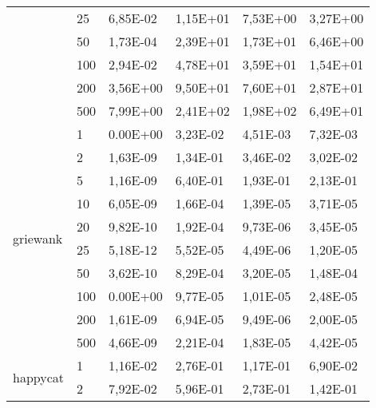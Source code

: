 \begin{longtable}[c]{|m{3.5cm}|l|l|l|l|l|}
                                        & 25        & 6,85E-02   & 1,15E+01   & 7,53E+00   & 3,27E+00  \\ \cline{2-6} 
                                        & 50        & 1,73E-04   & 2,39E+01   & 1,73E+01   & 6,46E+00  \\ \cline{2-6} 
                                        & 100       & 2,94E-02   & 4,78E+01   & 3,59E+01   & 1,54E+01  \\ \cline{2-6} 
                                        & 200       & 3,56E+00   & 9,50E+01   & 7,60E+01   & 2,87E+01  \\ \cline{2-6} 
                                        & 500       & 7,99E+00   & 2,41E+02   & 1,98E+02   & 6,49E+01  \\ \hline
\multirow{10}{*}{griewank}              & 1         & 0.00E+00   & 3,23E-02   & 4,51E-03   & 7,32E-03  \\ \cline{2-6} 
                                        & 2         & 1,63E-09   & 1,34E-01   & 3,46E-02   & 3,02E-02  \\ \cline{2-6} 
                                        & 5         & 1,16E-09   & 6,40E-01   & 1,93E-01   & 2,13E-01  \\ \cline{2-6} 
                                        & 10        & 6,05E-09   & 1,66E-04   & 1,39E-05   & 3,71E-05  \\ \cline{2-6} 
                                        & 20        & 9,82E-10   & 1,92E-04   & 9,73E-06   & 3,45E-05  \\ \cline{2-6} 
                                        & 25        & 5,18E-12   & 5,52E-05   & 4,49E-06   & 1,20E-05  \\ \cline{2-6} 
                                        & 50        & 3,62E-10   & 8,29E-04   & 3,20E-05   & 1,48E-04  \\ \cline{2-6} 
                                        & 100       & 0.00E+00   & 9,77E-05   & 1,01E-05   & 2,48E-05  \\ \cline{2-6} 
                                        & 200       & 1,61E-09   & 6,94E-05   & 9,49E-06   & 2,00E-05  \\ \cline{2-6} 
                                        & 500       & 4,66E-09   & 2,21E-04   & 1,83E-05   & 4,42E-05  \\ \hline
\multirow{10}{*}{happycat}              & 1         & 1,16E-02   & 2,76E-01   & 1,17E-01   & 6,90E-02  \\ \cline{2-6} 
                                        & 2         & 7,92E-02   & 5,96E-01   & 2,73E-01   & 1,42E-01  \\ \cline{2-6} 

\end{longtable}
